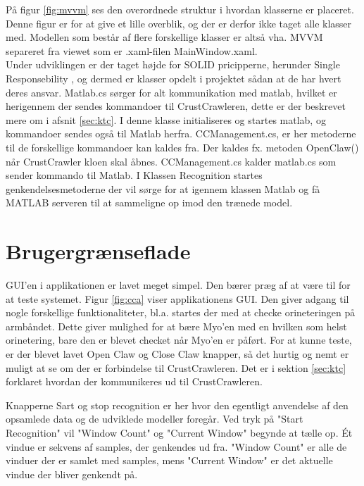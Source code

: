 På figur \ref{fig:mvvm} ses den overordnede struktur i hvordan klasserne er placeret. Denne figur er for at give et lille overblik, og der er derfor ikke taget alle klasser med. Modellen som består af flere forskellige klasser er altså vha. MVVM separeret fra viewet som er .xaml-filen MainWindow.xaml.\\
Under udviklingen er der taget højde for SOLID pricipperne, herunder Single Responsebility \citep{RefWorks:9}, og dermed er klasser opdelt i projektet sådan at de har hvert deres ansvar. Matlab.cs sørger for alt kommunikation med matlab, hvilket er herigennem der sendes kommandoer til CrustCrawleren, dette er der beskrevet mere om i afsnit \ref{sec:ktc}. I denne klasse initialiseres og startes matlab, og kommandoer sendes også til Matlab herfra. CCManagement.cs, er her metoderne til de forskellige kommandoer kan kaldes fra. Der kaldes fx. metoden OpenClaw() når CrustCrawler kloen skal åbnes. CCManagement.cs kalder matlab.cs som sender kommando til Matlab. I Klassen Recognition startes genkendelsesmetoderne der vil sørge for at igennem klassen Matlab og få MATLAB serveren til at sammeligne op imod den trænede model.

\section{Brugergrænseflade}

GUI'en i applikationen er lavet meget simpel. Den bærer præg af at være til for at teste systemet. Figur \ref{fig:cca} viser applikationens GUI. Den giver adgang til nogle forskellige funktionaliteter, bl.a. startes der med at checke orineteringen på armbåndet. Dette giver mulighed for at bære Myo'en med en hvilken som helst orinetering, bare den er blevet checket når Myo'en er påført. For at kunne teste, er der blevet lavet Open Claw og Close Claw knapper, så det hurtig og nemt er muligt at se om der er forbindelse til CrustCrawleren. Det er i sektion \ref{sec:ktc} forklaret hvordan der kommunikeres ud til CrustCrawleren.

Knapperne Sart og stop recognition er her hvor den egentligt anvendelse af den opsamlede data og de udviklede modeller foregår. Ved tryk på "Start Recognition" vil "Window Count" og "Current Window" begynde at tælle op. Ét vindue er sekvens af samples, der genkendes ud fra. "Window Count" er alle de vinduer der er samlet med samples, mens "Current Window" er det aktuelle vindue der bliver genkendt på.

